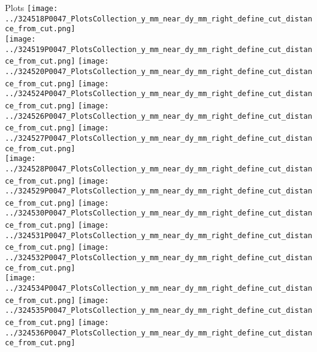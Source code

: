 \documentclass{beamer}
\begin{document}
\begin{frame}
\begin{block}{Plots}
                \texttt{[image: ../324518P0047\_PlotsCollection\_y\_mm\_near\_dy\_mm\_right\_define\_cut\_distance\_from\_cut.png]}\\
                \texttt{[image: ../324519P0047\_PlotsCollection\_y\_mm\_near\_dy\_mm\_right\_define\_cut\_distance\_from\_cut.png]}
                \texttt{[image: ../324520P0047\_PlotsCollection\_y\_mm\_near\_dy\_mm\_right\_define\_cut\_distance\_from\_cut.png]}
                \texttt{[image: ../324524P0047\_PlotsCollection\_y\_mm\_near\_dy\_mm\_right\_define\_cut\_distance\_from\_cut.png]}
                \texttt{[image: ../324526P0047\_PlotsCollection\_y\_mm\_near\_dy\_mm\_right\_define\_cut\_distance\_from\_cut.png]}
                \texttt{[image: ../324527P0047\_PlotsCollection\_y\_mm\_near\_dy\_mm\_right\_define\_cut\_distance\_from\_cut.png]}\\
                \texttt{[image: ../324528P0047\_PlotsCollection\_y\_mm\_near\_dy\_mm\_right\_define\_cut\_distance\_from\_cut.png]}
                \texttt{[image: ../324529P0047\_PlotsCollection\_y\_mm\_near\_dy\_mm\_right\_define\_cut\_distance\_from\_cut.png]}
                \texttt{[image: ../324530P0047\_PlotsCollection\_y\_mm\_near\_dy\_mm\_right\_define\_cut\_distance\_from\_cut.png]}
                \texttt{[image: ../324531P0047\_PlotsCollection\_y\_mm\_near\_dy\_mm\_right\_define\_cut\_distance\_from\_cut.png]}
                \texttt{[image: ../324532P0047\_PlotsCollection\_y\_mm\_near\_dy\_mm\_right\_define\_cut\_distance\_from\_cut.png]}\\
                \texttt{[image: ../324534P0047\_PlotsCollection\_y\_mm\_near\_dy\_mm\_right\_define\_cut\_distance\_from\_cut.png]}
                \texttt{[image: ../324535P0047\_PlotsCollection\_y\_mm\_near\_dy\_mm\_right\_define\_cut\_distance\_from\_cut.png]}
                \texttt{[image: ../324536P0047\_PlotsCollection\_y\_mm\_near\_dy\_mm\_right\_define\_cut\_distance\_from\_cut.png]}

        \end{block}
\end{frame}
\end{document}
